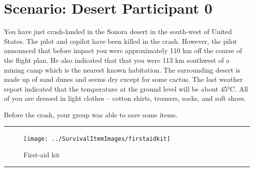 \documentclass{article}
\begin{document}
    \clearpage
    \section*{Scenario: \textmd{Desert} \hfill Participant \textmd{0}}
    \Large You have just crash-landed in the Sonora desert in the south-west of United States. The pilot and copilot have been killed in the crash. However, the pilot announced that before impact you were approximately 110 km off the course of the flight plan. He also indicated that that you were 113 km southwest of a mining camp which is the nearest known habitation. The surrounding desert is made up of sand dunes and seems dry except for some cactus. The last weather report indicated that the temperature at the ground level will be about 45°C. All of you are dressed in light clothes – cotton shirts, trousers, socks, and soft shoes. 

Before the crash, your group was able to save some items.\clearpage
        \par\noindent\rule{\textwidth}{0.4pt}
    \begin{figure}[H]
        \centering
        \begin{minipage}{0.25\textwidth}
            \centering
            \texttt{[image: ../SurvivalItemImages/firstaidkit]}
        \end{minipage}\hfill
        \begin{minipage}{0.7\textwidth}
            \centering
            \Large First-aid kit
        \end{minipage}
    \end{figure}
    \vspace{-0.8em}
    \noindent\rule{\textwidth}{0.4pt}
            
\end{document}
